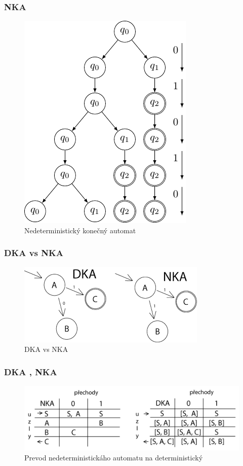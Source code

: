 \documentclass{beamer}
\begin{document}
\begin{frame}
\frametitle{NKA}
\begin{figure}[Htbp]
\includegraphics[scale = 0.70]{nedeterministicky-konecny-automat-5fb817ed126c31736b4a776ce42cc7cc.png}
\caption{Nedeterministický konečný automat }
\end{figure}
\end{frame}


\begin{frame}
\frametitle{DKA vs NKA}
\begin{figure}[Htbp]
\includegraphics[scale = 0.68]{DKA_vs_NKA.png}
\caption{DKA vs NKA}
\end{figure}
\end{frame}

\begin{frame}
\frametitle{DKA , NKA}
\begin{figure}[Htbp]
\includegraphics[scale = 0.50]{NKA_DKA.png}
\caption{Prevod nedeterministickáho automatu na deterministický }
\end{figure}
\end{frame}
\end{document}
